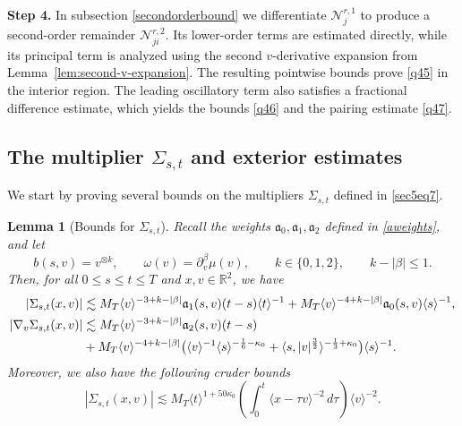 \documentclass[reqno,11pt]{amsart}
\numberwithin{equation}{section}
\def\R{{\mathbb R}}
\def\R{{\bf R}}
\def\R{\mathbb{R}}
\newtheorem{lemma}[theorem]{Lemma}
\begin{document}
{\bf{Step 4.}} In subsection \ref{secondorderbound} we differentiate $\mathcal N_j^{r,1}$ to produce a second-order remainder
$\mathcal N_{ji}^{r,2}$. Its lower-order terms are estimated directly,
while its principal term is analyzed using the second $v$-derivative
expansion from Lemma~\ref{lem:second-v-expansion}. The resulting
pointwise bounds prove \eqref{q45} in the interior region. The leading oscillatory term also
satisfies a fractional difference estimate, which yields the bounds \eqref{q46} and
the pairing estimate \eqref{q47}.



\subsection{The multiplier $\Sigma_{s,t}$ and exterior estimates}\label{subsection5.3} We start by proving several bounds on the multipliers $\Sigma_{s,t}$ defined in \eqref{sec5eq7}.
	
\begin{lemma}[Bounds for $\Sigma_{s,t}$]\label{lem:Sigma-new}
	Recall the weights $\mathfrak a_0,\mathfrak a_1,\mathfrak a_2$ defined in \eqref{aweights}, and let
	\[
	b(s,v)=v^{\otimes k},
	\qquad
	\omega(v)=\partial_v^\beta\mu(v),
	\qquad
	k\in\{0,1,2\},
	\qquad
	k-|\beta|\leq 1.
	\]
	Then, for all $0\leq s\leq t\leq T$ and $x,v\in\R^2$, we have
	\begin{align}
		|\Sigma_{s,t}(x,v)|&\lesssim M_T\langle v\rangle^{-3+k-|\beta|}\mathfrak a_1(s,v)(t-s)\langle t\rangle^{-1}+ M_T\langle v\rangle^{-4+k-|\beta|}
		\mathfrak a_0(s,v)\langle s\rangle^{-1},
		\label{q3}\\
		|\nabla_v\Sigma_{s,t}(x,v)|
		&\lesssim
		M_T\langle v\rangle^{-3+k-|\beta|}
		\mathfrak a_2(s,v)(t-s)
		\notag\\
		&+M_T\langle v\rangle^{-4+k-|\beta|}\big(\langle v\rangle^{-1}\langle s\rangle^{-\frac16-\kappa_0}+\langle s,|v|^{\frac32}\rangle^{-\frac13+\kappa_0}\big)\langle s\rangle^{-1}.
		\label{q10}
	\end{align}
	Moreover, we also have the following cruder bounds
	\begin{equation}\label{z2}
		|\Sigma_{s,t}(x,v)|
		\lesssim
		M_T\langle t\rangle^{1+50\kappa_0}
		\left(
		\int_0^t\langle x-\tau v\rangle^{-2}\,d\tau
		\right)
		\langle v\rangle^{-2}.
	\end{equation}
\end{lemma}
\end{document}
